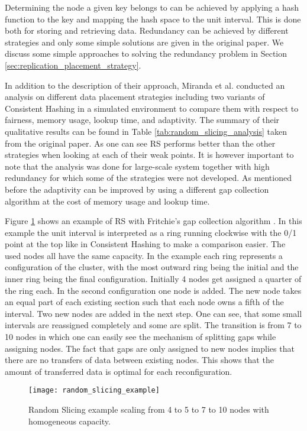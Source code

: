 Determining the node a given key belongs to can be achieved by applying a hash function to the key and mapping the hash space to the unit interval.
This is done both for storing and retrieving data.
Redundancy can be achieved by different strategies and only some simple solutions are given in the original paper.
We discuss some simple approaches to solving the redundancy problem in Section \ref{sec:replication_placement_strategy}.

In addition to the description of their approach, Miranda et al.\cite{Miranda2014} conducted an analysis on different data placement strategies including two variants of Consistent Hashing in a simulated environment to compare them with respect to fairness, memory usage, lookup time, and adaptivity.
The summary of their qualitative results can be found in Table \ref{tab:random_slicing_analysis} taken from the original paper\cite{Miranda2014}.
As one can see \ac{RS} performs better than the other strategies when looking at each of their weak points.
It is however important to note that the analysis was done for large-scale system together with high redundancy for which some of the strategies were not developed.
As mentioned before the adaptivity can be improved by using a different gap collection algorithm at the cost of memory usage and lookup time.

Figure \ref{fig:random_slicing_example} shows an example of \ac{RS} with Fritchie's gap collection algorithm .
In this example the unit interval is interpreted as a ring running clockwise with the 0/1 point at the top like in Consistent Hashing to make a comparison easier.
The used nodes all have the same capacity.
In the example each ring represents a configuration of the cluster, with the most outward ring being the initial and the inner ring being the final configuration.
Initially 4 nodes get assigned a quarter of the ring each.
In the second configuration one node is added.
The new node takes an equal part of each existing section such that each node owns a fifth of the interval.
Two new nodes are added in the next step.
One can see, that some small intervals are reassigned completely and some are split.
The transition is from 7 to 10 nodes in which one can easily see the mechanism of splitting gaps while assigning nodes.
The fact that gaps are only assigned to new nodes implies that there are no transfers of data between existing nodes.
This shows that the amount of transferred data is optimal for each reconfiguration.

\begin{figure}
\texttt{[image: random\_slicing\_example]}
\caption[Random Slicing example]{Random Slicing example scaling from 4 to 5 to 7 to 10 nodes with homogeneous capacity.}
\label{fig:random_slicing_example}
\end{figure}

